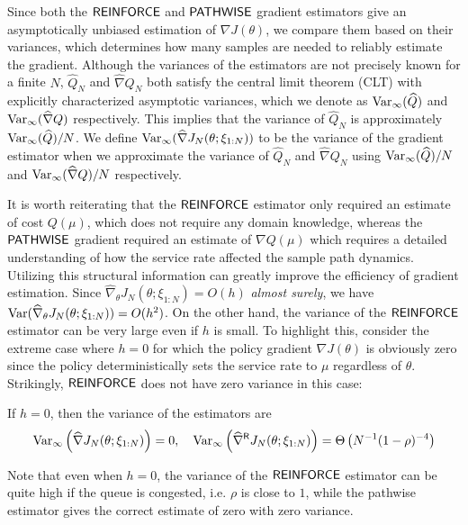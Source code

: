 Since both the $\mathsf{REINFORCE}$ and $\mathsf{PATHWISE}$ gradient estimators give an asymptotically unbiased estimation of $\nabla J(\theta)$, we compare them based on their variances, which determines how many samples are needed to reliably estimate the gradient. Although the variances of the estimators are not precisely known for a finite $N$, $\widehat{Q}_{N}$ and $\widehat{\nabla}Q_{N}$ both satisfy the central limit theorem (CLT) with explicitly characterized asymptotic variances, which we denote as ${\rm Var}_{\infty}(\widehat{Q})$ and ${\rm Var}_{\infty}(\widehat{\nabla}Q)$ 
respectively. This implies that the variance of $\widehat{Q}_{N}$ is approximately ${\rm Var}_{\infty}(\widehat{Q})/N$. We define ${\rm Var}_{\infty}(\widehat{\nabla} J_{N}(\theta; \xi_{1:N}))$ to be the variance of the gradient estimator when we approximate the variance of $\widehat{Q}_{N}$ and $\widehat{\nabla}Q_{N}$ using ${\rm Var}_{\infty}(\widehat{Q})/N$ and ${\rm Var}_{\infty}(\widehat{\nabla}Q)/N$ respectively.

It is worth reiterating that the $\mathsf{REINFORCE}$ estimator only required an estimate of cost $Q(\mu)$, which does not require any domain knowledge, whereas the $\mathsf{PATHWISE}$ gradient required an estimate of $\nabla Q(\mu)$ which requires a detailed understanding of how the service rate affected the sample path dynamics. Utilizing this structural information can greatly improve the efficiency of gradient estimation. Since $\widehat{\nabla}_{\theta} J_{N}(\theta; \xi_{1:N}) = O(h)$ \emph{almost surely},
we have ${\rm Var}(\widehat{\nabla}_{\theta}J_{N}(\theta; \xi_{1:N})) = O(h^{2})$. On the other hand, the variance of the $\mathsf{REINFORCE}$ estimator can be very large even if $h$ is small. To highlight this, consider the extreme case where $h = 0$ for which the policy gradient $\nabla J(\theta)$ is obviously zero since the policy deterministically sets the service rate to $\mu$ regardless of $\theta$. Strikingly, $\mathsf{REINFORCE}$ does not have zero variance in this case:


\begin{observation}
\label{obs:h_0}
If $h = 0$, then the variance of the estimators are
\[
{\rm Var}_{\infty}\left(\widehat{\nabla} J_{N}(\theta; \xi_{1:N}) \right) = 0, \quad
{\rm Var}_{\infty}\left(\widehat{\nabla}^{\mathsf{R}} J_{N}(\theta; \xi_{1:N}) \right)
= \Theta \left( N^{-1} (1 - \rho)^{-4} \right)
\]
\end{observation}
\noindent Note that even when $h=0$, the variance of the $\mathsf{REINFORCE}$ estimator can be quite high if the queue is congested, i.e. $\rho$ is close to $1$, while the pathwise estimator gives the correct estimate of zero with zero variance.

